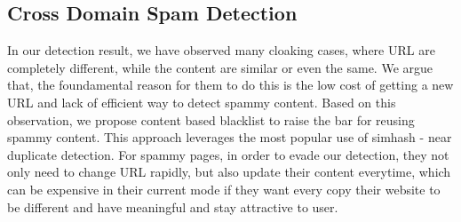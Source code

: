 \subsection{Cross Domain Spam Detection}
In our detection result, we have observed many cloaking cases, where URL are
completely different, while the content are similar or even the same.
We argue that, the foundamental reason for them to do this is the low cost of
getting a new URL and lack of efficient way to detect spammy content.
Based on this observation, we propose content based blacklist to raise the bar
for reusing spammy content. This approach leverages the most popular use of
simhash - near duplicate detection. For spammy pages, in order to evade our
detection, they not only need to change URL rapidly, but also update their
content everytime, which can be expensive in their current mode if they want
every copy their website to be different and have meaningful and stay attractive
to user.



